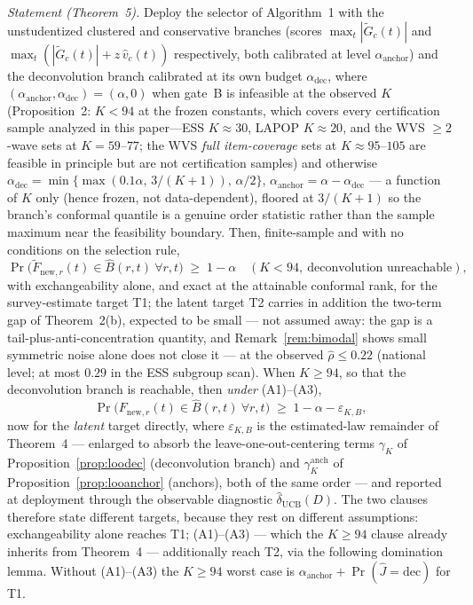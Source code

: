\documentclass[12pt]{article}
\theoremstyle{definition}
\theoremstyle{remark}
\newcommand{\Ftilde}{\widetilde{F}}
\newcommand{\Gtilde}{\widetilde{G}}
\newcommand{\rhohat}{\widehat{\rho}}
\begin{document}
\emph{Statement (Theorem~5).} Deploy the selector of Algorithm~1 with the
unstudentized clustered and conservative branches (scores $\max_t|\Gtilde_c(t)|$ and
$\max_t(|\Gtilde_c(t)|+z\,\widehat v_c(t))$ respectively, both calibrated at level
$\alpha_{\text{anchor}}$) and the deconvolution branch calibrated at its own budget
$\alpha_{\text{dec}}$, where $(\alpha_{\text{anchor}},\alpha_{\text{dec}})=
(\alpha,0)$ when gate~B is infeasible at the observed $K$
(Proposition~2: $K<94$ at the frozen constants, which covers every certification
sample analyzed in this paper---ESS $K\approx30$, LAPOP $K\approx20$, and the WVS
$\ge2$-wave sets at $K=59$--$77$; the WVS \emph{full item-coverage} sets at
$K\approx95$--$105$ are feasible in principle but are not certification samples) and
otherwise
$\alpha_{\text{dec}}=\min\{\max(0.1\alpha,\,3/(K{+}1)),\,\alpha/2\}$,
$\alpha_{\text{anchor}}=\alpha-\alpha_{\text{dec}}$ --- a function of $K$ only
(hence frozen, not data-dependent), floored at $3/(K{+}1)$ so the branch's conformal
quantile is a genuine order statistic rather than the sample maximum near the
feasibility boundary. Then, finite-sample and
with no conditions on the selection rule,
\[
\Pr\big(\Ftilde_{\text{new},r}(t)\in\widehat B(r,t)\ \forall r,t\big)\;\ge\;1-\alpha
\quad (K<94,\ \text{deconvolution unreachable}),
\]
with exchangeability alone, and exact at the attainable conformal rank, for
the survey-estimate target T1; the
latent target T2 carries in addition the two-term gap of Theorem~2(b),
expected to be small --- not assumed away: the gap is a tail-plus-anti-concentration
quantity, and Remark~\ref{rem:bimodal} shows small symmetric noise alone does not
close it --- at the observed $\rhohat\le0.22$ (national level; at most $0.29$ in
the ESS subgroup scan). When $K\ge94$, so that the deconvolution branch is
reachable, then \emph{under} (A1)--(A3),
\[
\Pr\big(F_{\text{new},r}(t)\in\widehat B(r,t)\ \forall r,t\big)\;\ge\;
1-\alpha-\varepsilon_{K,B},
\]
now for the \emph{latent} target directly, where $\varepsilon_{K,B}$ is the
estimated-law remainder of Theorem~4 --- enlarged to absorb the
leave-one-out-centering terms $\gamma_K$ of Proposition~\ref{prop:loodec}
(deconvolution branch) and $\gamma^{\text{anch}}_K$ of
Proposition~\ref{prop:looanchor} (anchors), both of the same order --- and
reported at deployment through the observable diagnostic
$\widehat\delta_{\text{UCB}}(D)$. The two clauses therefore state different
targets, because they rest on different assumptions: exchangeability alone
reaches T1; (A1)--(A3) --- which the $K\ge94$ clause already inherits from
Theorem~4 --- additionally reach T2, via the following domination lemma.
Without (A1)--(A3) the $K\ge94$ worst case is
$\alpha_{\text{anchor}}+\Pr(\widehat J=\text{dec})$ for T1.
\end{document}
